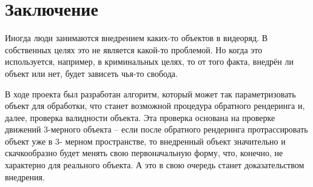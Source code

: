 \documentclass[]{article}
\begin{document}
	\newpage
	\section*{Заключение}
	Иногда люди занимаются внедрением каких-то объектов в видеоряд. В собственных целях это не является какой-то проблемой. Но когда это используется, например, в криминальных целях, то от того факта, внедрён ли объект или нет, будет зависеть чья-то свобода. 
	
	В ходе проекта был разработан алгоритм, который может так параметризовать объект для обработки, что станет возможной процедура обратного рендеринга и, далее, проверка валидности объекта. Эта проверка основана на проверке движений 3-мерного объекта – если после обратного рендеринга протрассировать объект уже в 3- мерном пространстве, то внедренный объект значительно и скачкообразно будет менять свою первоначальную форму, что, конечно, не характерно для реального объекта. А это в свою очередь станет доказательством внедрения.
	
	
\end{document}
